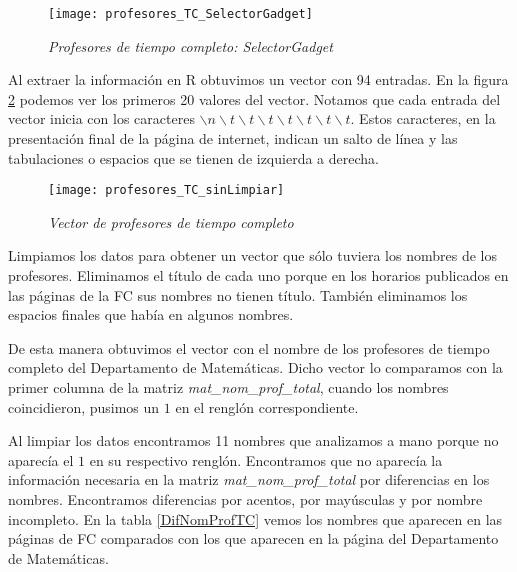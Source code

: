\begin{figure}[H]
\centering
\texttt{[image: profesores\_TC\_SelectorGadget]} %
\caption{\textit{Profesores de tiempo completo: SelectorGadget}}\label{profTC_SelectorGadget}
\end{figure}

Al extraer la información en R obtuvimos un vector con 94 entradas. En la figura \ref{profTC_sinLimpiar} podemos ver los primeros 20 valores del vector. Notamos que cada entrada del vector inicia con los caracteres $\backslash n \backslash t \backslash t \backslash t \backslash t \backslash t \backslash t \backslash t$. Estos caracteres, en la presentación final de la página de internet, indican un salto de línea y las tabulaciones o espacios que se tienen de izquierda a derecha.

\begin{figure}[H]
\centering
\texttt{[image: profesores\_TC\_sinLimpiar]} %
\caption{\textit{Vector de profesores de tiempo completo}}\label{profTC_sinLimpiar}
\end{figure}

Limpiamos los datos para obtener un vector que sólo tuviera los nombres de los profesores. Eliminamos el título de cada uno porque en los horarios publicados en las páginas de la FC sus nombres no tienen título. También eliminamos los espacios finales que había en algunos nombres.

De esta manera obtuvimos el vector con el nombre de los profesores de tiempo completo del Departamento de Matemáticas. Dicho vector lo comparamos con la primer columna de la matriz \textit{mat\_nom\_prof\_total}, cuando los nombres coincidieron, pusimos un $1$ en el renglón correspondiente.

Al limpiar los datos encontramos 11 nombres que analizamos a mano porque no aparecía el $1$ en su respectivo renglón. Encontramos que no aparecía la información necesaria en la matriz \textit{mat\_nom\_prof\_total} por diferencias en los nombres. Encontramos diferencias por acentos, por mayúsculas y por nombre incompleto. En la tabla \ref{DifNomProfTC} vemos los nombres que aparecen en las páginas de FC comparados con los que aparecen en la página del Departamento de Matemáticas.

